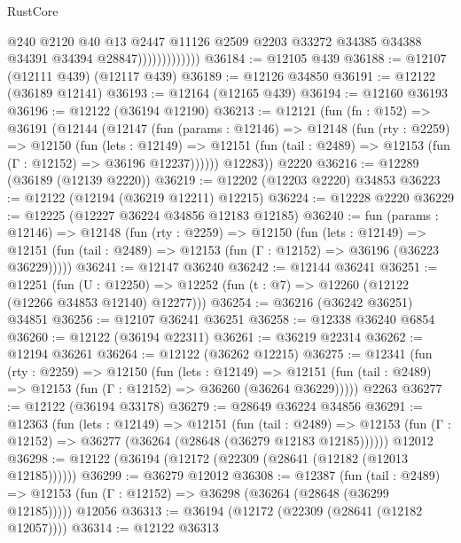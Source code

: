 \begin{lexlean}{RustCore}
\begin{coremodule}
                              @240
                              @2120
                              @40
                              @13
                              @2447
                              @11126
                              @2509
                              @2203
                              @33272
                              @34385
                              @34388
                              @34391
                              @34394
                              @28847)))))))))))))
@36184 := @12105 @439
@36188 := @12107 (@12111 @439) (@12117 @439)
@36189 := @12126 @34850
@36191 := @12122 (@36189 @12141)
@36193 := @12164 (@12165 @439)
@36194 := @12160 @36193
@36196 := @12122 (@36194 @12190)
@36213 := @12121
    (fun (fn : @152) =>
    @36191
      (@12144
        (@12147
          (fun (params : @12146) =>
          @12148
            (fun (rty : @2259) =>
            @12150
              (fun (lets : @12149) =>
              @12151 (fun (tail : @2489) => @12153 (fun (Γ : @12152) => @36196 @12237))))))
        @12283))
    @2220
@36216 := @12289 (@36189 (@12139 @2220))
@36219 := @12202 (@12203 @2220) @34853
@36223 := @12122 (@12194 (@36219 @12211) @12215)
@36224 := @12228 @2220
@36229 := @12225 (@12227 @36224 @34856 @12183 @12185)
@36240 := fun (params : @12146) =>
  @12148
    (fun (rty : @2259) =>
    @12150
      (fun (lets : @12149) =>
      @12151 (fun (tail : @2489) => @12153 (fun (Γ : @12152) => @36196 (@36223 @36229)))))
@36241 := @12147 @36240
@36242 := @12144 @36241
@36251 := @12251
    (fun (U : @12250) => @12252 (fun (t : @7) => @12260 (@12122 (@12266 @34853 @12140) @12277)))
@36254 := @36216 (@36242 @36251) @34851
@36256 := @12107 @36241 @36251
@36258 := @12338 @36240 @6854
@36260 := @12122 (@36194 @22311)
@36261 := @36219 @22314
@36262 := @12194 @36261
@36264 := @12122 (@36262 @12215)
@36275 := @12341
    (fun (rty : @2259) =>
    @12150
      (fun (lets : @12149) =>
      @12151 (fun (tail : @2489) => @12153 (fun (Γ : @12152) => @36260 (@36264 @36229)))))
    @2263
@36277 := @12122 (@36194 @33178)
@36279 := @28649 @36224 @34856
@36291 := @12363
    (fun (lets : @12149) =>
    @12151
      (fun (tail : @2489) =>
      @12153 (fun (Γ : @12152) => @36277 (@36264 (@28648 (@36279 @12183 @12185))))))
    @12012
@36298 := @12122 (@36194 (@12172 (@22309 (@28641 (@12182 (@12013 @12185))))))
@36299 := @36279 @12012
@36308 := @12387
    (fun (tail : @2489) => @12153 (fun (Γ : @12152) => @36298 (@36264 (@28648 (@36299 @12185)))))
    @12056
@36313 := @36194 (@12172 (@22309 (@28641 (@12182 @12057))))
@36314 := @12122 @36313

\end{coremodule}
\end{lexlean}

